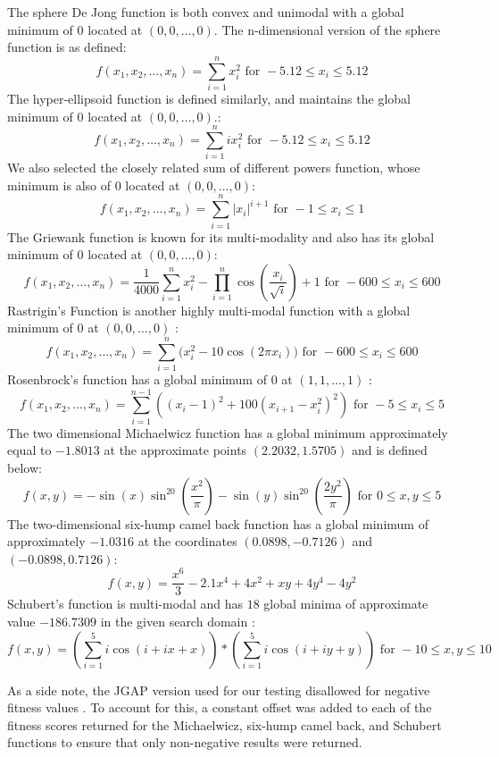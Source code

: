 %
%
The sphere De Jong function is both convex and unimodal with a global minimum of $0$ located at $(0,0,\ldots,0)$. The n-dimensional version of the sphere function is as defined:
\[ f(x_1,x_2,\ldots,x_n) = \sum\limits_{i=1}^n x_i^2 \text{ for } -5.12 \leq x_i \leq 5.12 \]
%
%
The hyper-ellipsoid function is defined similarly, and maintains the global minimum of $0$ located at $(0,0,\ldots,0)$.:
\[ f(x_1,x_2,\ldots,x_n) = \sum\limits_{i=1}^n ix_i^2 \text{ for } -5.12 \leq x_i \leq 5.12\]
%
%
We also selected the closely related sum of different powers function, whose minimum is also of $0$ located at $(0,0,\ldots,0)$:
\[ f(x_1,x_2,\ldots,x_n) = \sum\limits_{i=1}^n |x_i|^{i+1} \text{ for } -1 \leq x_i \leq 1\]
%
%
The Griewank function is known for its multi-modality and also has its global minimum of $0$ located at $(0,0,\ldots,0)$:
 \[ f(x_1,x_2,\ldots,x_n) = \frac{1}{4000}\sum\limits_{i=1}^n x_i^{2} - \prod\limits_{i=1}^{n} \cos \left(\frac{x_i}{\sqrt{i}} \right)+1 \text{ for } -600 \leq x_i \leq 600\]
 Rastrigin's Function is another highly multi-modal function with a global minimum of $0$ at $(0,0,\ldots,0)$ :
 \[f(x_1,x_2,\ldots,x_n) = \sum\limits_{i=1}^n \big( x_i^2 - 10\cos(2\pi x_i) \big)\text{ for } -600 \leq x_i \leq 600\]
 Rosenbrock's function has a global minimum of 0 at $(1,1,\ldots,1)$ :
 \[f(x_1,x_2,\ldots,x_n) = \sum\limits_{i=1}^{n-1} ((x_i-1)^2 + 100(x_{i+1}-x_i^2)^2) \text{ for } -5 \leq x_i \leq 5\]
 The two dimensional Michaelwicz function has a global minimum approximately equal to $-1.8013$ at the approximate points $(2.2032,1.5705)$ and is defined below:
 \[ f(x,y) = -\sin(x)\sin^{20} \left(\frac{x^2}{\pi} \right) - \sin(y)\sin^{20} \left(\frac{2y^2}{\pi} \right) \text{ for } 0 \leq x,y \leq 5\]
 The two-dimensional six-hump camel back function has a global minimum of approximately $-1.0316$ at the coordinates $(0.0898,-0.7126)$ and $(-0.0898,0.7126)$:
 \[f(x,y) = \frac{x^6}{3}-2.1x^4+4x^2+xy+4y^4-4y^2 \]
 Schubert's function is multi-modal and has $18$ global minima of approximate value $-186.7309$ in the given search domain :
 \[ f(x,y) = \left( \sum\limits_{i=1}^{5} i\cos(i + ix + x) \right) * \left( \sum\limits_{i=1}^{5} i\cos(i + iy + y) \right) \text{ for } -10 \leq x,y \leq 10 \]
 
As a side note, the JGAP version used for our testing disallowed for negative fitness values \cite{jgap}. To account for this, a constant offset was added to each of the fitness scores returned for the Michaelwicz, six-hump camel back, and Schubert functions to ensure that only non-negative results were returned.
 
